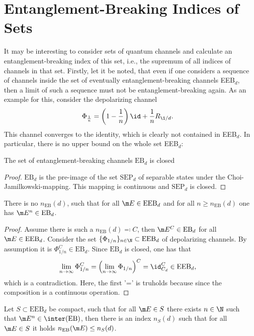 \section{Entanglement-Breaking Indices of Sets}\label{ch:result-sets}
It may be interesting to consider sets of quantum channels and calculate an entanglement-breaking index of this set, i.e., the supremum of all indices of channels in that set. Firstly, let it be noted, that even if one considers a sequence of channels inside the set of eventually entanglement-breaking channels EEB$_d$, then a limit of such a sequence must not be entanglement-breaking again. As an example for this, consider the depolarizing channel
\begin{align}
    \Phi_{\frac{1}{n}}= \left(1-\frac{1}{n}\right)\id + \frac{1}{n}R_{\1/d}.
\end{align}
This channel converges to the identity, which is clearly not contained in EEB$_d$. In particular, there is no upper bound on the whole set EEB$_d$:
\begin{lemma}
    The set of entanglement-breaking channels $\text{EB}_d$ is closed
\end{lemma}
\begin{proof}
    $\text{EB}_d$ is the pre-image of the set $\text{SEP}_d$ of separable states under the Choi-Jamilkowski-mapping. This mapping is continuous and $\text{SEP}_d$ is closed.
\end{proof}
\begin{prop}
    There is no $n_\text{EB}(d)$, such that for all $\m E \in \text{EEB}_d$ and for all $n\geq n_\text{EB}(d)$ one has $\m E^n \in \text{EB}_d$.
\end{prop}
\begin{proof}
    Assume there is such a $n_\text{EB}(d)\eqqcolon C$, then $\m E^C \in \text{EB}_d$ for all $ \m E \in \text{EEB}_d$. Consider the set $\{\Phi_{1/n}\}_{n\in \N} \subset \text{EEB}_d$ of depolarizing channels. By assumption it is $\Phi_{1/n}^C \in \text{EB}_d$. Since $\text{EB}_d$ is closed, one has that
    \begin{align*}
        \lim_{n\rightarrow \infty} \Phi_{1/n}^C = \left( \lim_{n\rightarrow \infty} \Phi_{1/n}\right)^C  = \id_{C_d}^C\in \text{EEB}_d,
    \end{align*}
    which is a contradiction. Here, the first '=' is truholds because since the composition is a continuous operation.
\end{proof}
\begin{prop}
    Let $S \subset \text{EEB}_d$ be compact, such that for all $\m E \in S$ there exists $n \in \N$ such that $\m E^n \in \inter(\text{EB})$, then there is an index $n_S(d)$ such that for all $\m E \in S$ it holds $n_\text{EB}(\m E)\leq n_S(d)$.\label{prop:set-index}
\end{prop}
